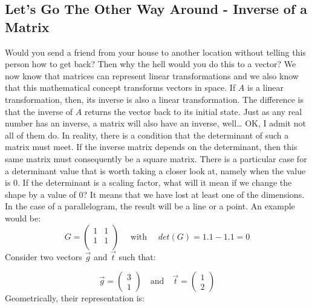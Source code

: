 \documentclass[600paper, 11pt,twoside,openany]{kdp}
\begin{document}
\subsection{Let’s Go The Other Way Around - Inverse of a Matrix}
\indent Would you send a friend from your house to another location without telling this person how to get back? Then why the hell  would you do this to a vector? We now know that matrices can represent linear transformations and we also know that this mathematical concept transforms vectors in space. If $A$ is a linear transformation, then, its inverse is also a linear transformation. The difference is that the inverse of $A$ returns the vector back to its initial state. Just as any real number has an inverse, a matrix will also have an inverse, well… OK, I admit not  all of them do. In reality, there is a condition that the determinant of such a matrix must meet. If the inverse matrix depends on the determinant, then this same matrix must consequently be a square matrix. There is a particular case for a determinant value that is worth taking a closer look at, namely when the value is 0. If the determinant is a scaling factor, what will it mean if we change the shape by a value of 0? It means that we have lost at least one of the dimensions. In the case of a parallelogram, the result will be a line or a point. An example would be:
\[
G  = 
\begin{pmatrix}
 1 & 1\\
1 & 1\\
\end{pmatrix} \quad
\text{ with } \quad det(G) = 1.1 - 1.1 = 0
\]
\indent Consider two vectors $\overrightarrow{g}$ and $\overrightarrow{t}$ such that:

\[ \overrightarrow{g} = \begin{pmatrix}
3\\
1
\end{pmatrix}
\quad \textrm{and} \quad \overrightarrow{t} = \begin{pmatrix}
1\\
2
\end{pmatrix}
\]
\indent Geometrically, their representation is:
\end{document}
